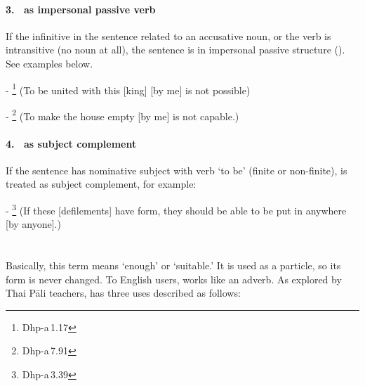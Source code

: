 \paragraph*{3.\  as impersonal passive verb} If the infinitive in the sentence related to an accusative noun, or the verb is intransitive (no noun at all), the sentence is in impersonal passive structure (). See examples below.\par
- \footnote{Dhp-a\,1.17} (To be united with this [king] [by me] is not possible)\par
- \footnote{Dhp-a\,7.91} (To make the house empty [by me] is not capable.)\par

\paragraph*{4.\  as subject complement} If the sentence has nominative subject with verb `to be' (finite or non-finite),  is treated as subject complement, for example:\par
- \footnote{Dhp-a\,3.39} (If these [defilements] have form, they should be able to be put in anywhere [by anyone].)\par

\section*{}

Basically, this term means `enough' or `suitable.' It is used as a particle, so its form is never changed. To English users,  works like an adverb. As explored by Thai P\=ali teachers,  has three uses described as follows:

